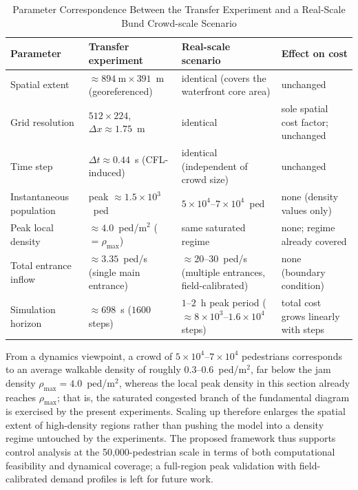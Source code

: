 \documentclass[lettersize,journal]{IEEEtran}
\begin{document}
\begin{table}[!t]
\centering
\caption{Parameter Correspondence Between the Transfer Experiment and a Real-Scale Bund Crowd-scale Scenario}
\label{tab:bund_scale_projection}
\footnotesize
\setlength{\tabcolsep}{6pt}
\begin{tabular}{@{}>{\raggedright\arraybackslash}p{}
>{\raggedright\arraybackslash}p{}
>{\raggedright\arraybackslash}p{}
>{\raggedright\arraybackslash}p{}@{}}
\hline
Parameter & Transfer experiment & Real-scale scenario & Effect on cost \\
\hline
Spatial extent & $\approx894~\mathrm{m}\times391$~m (georeferenced) & identical (covers the waterfront core area) & unchanged \\
Grid resolution & $512\times224$, $\Delta x\approx1.75$~m & identical & sole spatial cost factor; unchanged \\
Time step & $\Delta t\approx0.44$~s (CFL-induced) & identical (independent of crowd size) & unchanged \\
Instantaneous population & peak $\approx1.5\times10^3$~ped & $5\times10^4$--$7\times10^4$~ped & none (density values only) \\
Peak local density & $\approx4.0$~ped/m$^2$ ($=\rho_{\max}$) & same saturated regime & none; regime already covered \\
Total entrance inflow & $\approx3.35$~ped/s (single main entrance) & $\approx20$--$30$~ped/s (multiple entrances, field-calibrated) & none (boundary condition) \\
Simulation horizon & $\approx698$~s ($1600$ steps) & $1$--$2$~h peak period ($\approx8\times10^3$--$1.6\times10^4$ steps) & total cost grows linearly with steps \\
\hline
\end{tabular}
\end{table}

From a dynamics viewpoint, a crowd of $5\times10^4$--$7\times10^4$ pedestrians corresponds to an average walkable density of roughly $0.3$--$0.6$~ped/m$^2$, far below the jam density $\rho_{\max}=4.0$~ped/m$^2$, whereas the local peak density in this section already reaches $\rho_{\max}$; that is, the saturated congested branch of the fundamental diagram is exercised by the present experiments.
Scaling up therefore enlarges the spatial extent of high-density regions rather than pushing the model into a density regime untouched by the experiments.
The proposed framework thus supports control analysis at the 50,000-pedestrian scale in terms of both computational feasibility and dynamical coverage; a full-region peak validation with field-calibrated demand profiles is left for future work.
\end{document}
